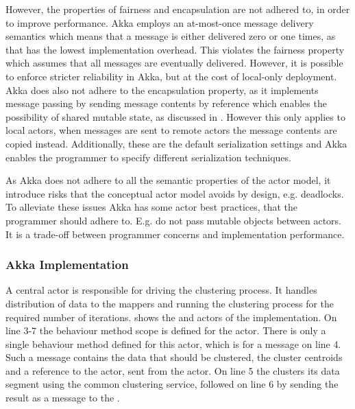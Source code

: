 However, the properties of fairness and encapsulation are not adhered to, in order to improve performance. Akka employs an at-most-once message delivery semantics which means that a message is either delivered zero or one times, as that has the lowest implementation overhead\cite[p. 27]{akkaDoc}. This violates the fairness property which assumes that all messages are eventually delivered. However, it is possible to enforce stricter reliability in Akka, but at the cost of local-only deployment\cite[p. 29]{akkaDoc}. Akka does also not adhere to the encapsulation property, as it implements message passing by sending message contents by reference which enables the possibility of shared mutable state, as discussed in . However this only applies to local actors, when messages are sent to remote actors the message contents are copied instead. Additionally, these are the default serialization settings and Akka enables the programmer to specify different serialization techniques\cite[p. 219]{akkaDoc}.

As Akka does not adhere to all the semantic properties of the actor model, it introduce risks that the conceptual actor model avoids by design, e.g. deadlocks. To alleviate these issues Akka has some actor best practices, that the programmer should adhere to. E.g. do not pass mutable objects between actors\cite[p. 12]{akkaDoc}. It is a trade-off between programmer concerns and implementation performance.


\subsubsection{Akka Implementation}
A central  actor is responsible for driving the clustering process. It handles distribution of data to the mappers and running the clustering process for the required number of iterations.  shows the  and  actors of the implementation. On line 3-7 the behaviour method scope is defined for the  actor. There is only a single behaviour method defined for this actor, which is for a  message on line 4. Such a message contains the data that should be clustered, the cluster centroids and a reference to the  actor, sent from the  actor. On line 5 the  clusters its data segment using the common clustering service, followed on line 6 by sending the result as a  message to the .

